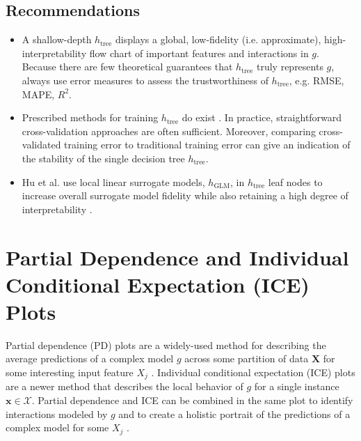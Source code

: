 \documentclass[sigconf, review]{acmart}
\begin{document}
\subsection{Recommendations}

\begin{itemize}
	
	\item A shallow-depth $h_{\text{tree}}$ displays a global, low-fidelity (i.e. approximate), high-interpretability flow chart of important features and interactions in $g$. Because there are few theoretical guarantees that $h_{\text{tree}}$ truly represents $g$, always use error measures to assess the trustworthiness of $h_{\text{tree}}$, e.g. RMSE, MAPE, $R^2$.
	
	\item Prescribed methods for training $h_{\text{tree}}$ do exist \cite{dt_surrogate1} \cite{dt_surrogate2}. In practice, straightforward cross-validation approaches are often sufficient. Moreover, comparing cross-validated training error to traditional training error can give an indication of the stability of the single decision tree $h_{\text{tree}}$.
	
	\item Hu et al. use local linear surrogate models, $h_{\text{GLM}}$, in $h_{\text{tree}}$ leaf nodes to increase overall surrogate model fidelity while also retaining a high degree of interpretability \cite{lime-sup}.
	
\end{itemize}

\section{Partial Dependence and Individual Conditional Expectation (ICE) Plots}
\label{sec:pd_ice}

Partial dependence (PD) plots are a widely-used method for describing the average predictions of a complex model $g$ across some partition of data $\mathbf{X}$ for some interesting input feature $X_j$ \cite{esl}. Individual conditional expectation (ICE) plots are a newer method that describes the local behavior of $g$ for a single instance $\mathbf{x} \in \mathcal{X}$. Partial dependence and ICE can be combined in the same plot to identify interactions modeled by $g$ and to create a holistic portrait of the predictions of a complex model for some $X_j$  \cite{ice_plots}.
\end{document}
